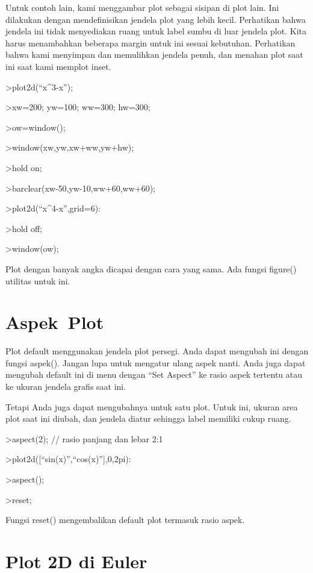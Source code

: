 \documentclass[
]{book}
\begin{document}
Untuk contoh lain, kami menggambar plot sebagai sisipan di plot lain. Ini dilakukan dengan mendefinisikan jendela plot yang lebih kecil. Perhatikan bahwa jendela ini tidak menyediakan ruang untuk label sumbu di luar jendela plot. Kita harus menambahkan beberapa margin untuk ini sesuai kebutuhan. Perhatikan bahwa kami menyimpan dan memulihkan jendela penuh, dan menahan plot saat ini saat kami memplot inset.

\textgreater plot2d(``x\^{}3-x'');

\textgreater xw=200; yw=100; ww=300; hw=300;

\textgreater ow=window();

\textgreater window(xw,yw,xw+ww,yw+hw);

\textgreater hold on;

\textgreater barclear(xw-50,yw-10,ww+60,ww+60);

\textgreater plot2d(``x\^{}4-x'',grid=6):

\textgreater hold off;

\textgreater window(ow);

Plot dengan banyak angka dicapai dengan cara yang sama. Ada fungsi figure() utilitas untuk ini.

\section{Aspek~Plot}\label{aspek-plot}

Plot default menggunakan jendela plot persegi. Anda dapat mengubah ini dengan fungsi aspek(). Jangan lupa untuk mengatur ulang aspek nanti. Anda juga dapat mengubah default ini di menu dengan ``Set Aspect'' ke rasio aspek tertentu atau ke ukuran jendela grafis saat ini.

Tetapi Anda juga dapat mengubahnya untuk satu plot. Untuk ini, ukuran area plot saat ini diubah, dan jendela diatur sehingga label memiliki cukup ruang.

\textgreater aspect(2); // rasio panjang dan lebar 2:1

\textgreater plot2d({[}``sin(x)'',``cos(x)''{]},0,2pi):

\textgreater aspect();

\textgreater reset;

Fungsi reset() mengembalikan default plot termasuk rasio aspek.

\section{Plot 2D di Euler}\label{plot-2d-di-euler}
\end{document}
